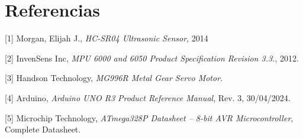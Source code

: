 \documentclass[a4paper,12pt]{article}
\begin{document}
\section{Referencias}

[1] Morgan, Elijah J., \textit{HC-SR04 Ultrasonic Sensor}, 2014

[2] InvenSens Inc, \textit{MPU 6000 and 6050 Product Specification Revision 3.3.}, 2012.

[3] Handson Technology, \textit{MG996R Metal Gear Servo Motor.}

[4] Arduino, \textit{Arduino UNO R3 Product Reference Manual}, Rev. 3, 30/04/2024.

[5] Microchip Technology, \textit{ATmega328P Datasheet – 8-bit AVR Microcontroller}, Complete Datasheet.
\end{document}
